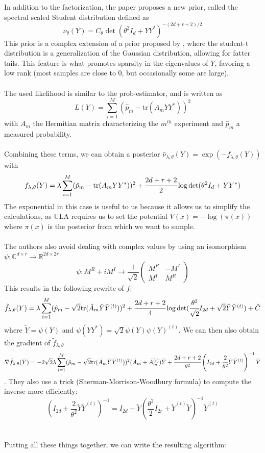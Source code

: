 \documentclass[12pt]{memoir}
\newcommand{\tr}{\text{tr}}
\begin{document}
In addition to the factorization, the paper proposes a new prior, called the spectral scaled Student distribution defined as
\[
\nu_{\theta} (Y) = C_\theta \det(\theta^2I_d + YY^*)^{-(2d+r+2)/2}
\]
This prior is a complex extension of a prior proposed by \cite{Dal20}, where the student-t distribution is a generalization of the Gaussian distribution, allowing for fatter tails. This feature is what promotes sparsity in the eigenvalues of $Y$, favoring a low rank (most samples are close to 0, but occasionally some are large).\\\\
The used likelihood is similar to the prob-estimator, and is written as 
\begin{equation}
L(Y) = \sum^{M}_{i=1} (\hat p_m - \tr(A_mYY^*))^2
\end{equation}
with $A_m$ the Hermitian matrix characterizing the $m^{th}$ experiment and $\hat p_m$ a measured probability.\\\\
Combining these terms, we can obtain a posterior $\hat \nu_{\lambda, \theta}(Y) = \exp(-f_{\lambda, \theta}(Y))$ with
\begin{equation}
    f_{\lambda, \theta}(Y) = \lambda \sum^{M}_{i=1} (\hat p_m - \tr(A_mYY^*))^2 + \cfrac{2d + r + 2}{2}\log \det(\theta^2I_d + YY^*)
\end{equation}
The exponential in this case is useful to us because it allows us to simplify the calculations, as ULA requires us to set the potential $V(x) = -\log(\pi(x))$ where $\pi(x)$ is the posterior from which we want to sample.\\\\ 
The authors also avoid dealing with complex values by using an isomorphism $\psi: \mathbb{C}^{d\times r}\rightarrow \mathbb{R}^{2d\times 2r}$
$$
\psi: M^R + iM^I \rightarrow \frac{1}{\sqrt 2} \begin{pmatrix}
    M^R & - M^I\\
    M^I & M^R
\end{pmatrix}
$$
This results in the following rewrite of $f$:
\[
\tilde f_{\lambda, \theta}(Y) = \lambda \sum^{M}_{i=1} (\hat p_m - \sqrt{2}\tr(\tilde A_m \tilde Y \tilde Y^{(t)}))^2 + \cfrac{2d + r + 2}{4}\log \det(\cfrac{\theta^2}{\sqrt 2}I_{2d} + \sqrt 2 \tilde Y \tilde Y^{(t)}) + \tilde C
\]
where $\tilde Y = \psi(Y)$ and $\psi(YY^*) = \sqrt{2} \psi(Y)\psi(Y)^{(t)}$. We can then also obtain the gradient of $\tilde f_{\lambda, \theta}$
\[
\nabla \tilde f_{\lambda, \theta}(\tilde Y) = -2\sqrt 2 \lambda \sum^{M}_{i=1} (\hat p_m - \sqrt{2}\tr(\tilde A_m \tilde Y \tilde Y^{(t)}))^2 (\tilde A_m + \tilde A^{(t)}_m)\tilde Y + \cfrac{2d + r + 2}{\theta^2} \left(I_{2d} + \cfrac{2}{\theta^2}\tilde Y \tilde Y^{(t)}\right)^{-1} \tilde Y
\]. They also use a trick (Sherman-Morrison-Woodbury formula) to compute the inverse more efficiently:
\[
\left( I_{2d} + \frac{2}{\theta^2} \tilde Y \tilde Y^{(t)} \right)^{-1} =  I_{2d} - \tilde Y \left( \frac{\theta^2}{2} I_{2r}+\tilde Y^{(t)} \tilde Y \right)^{-1} \tilde Y^{(t)}
\]\\\\
Putting all these things together, we can write the resulting algorithm:
\end{document}
